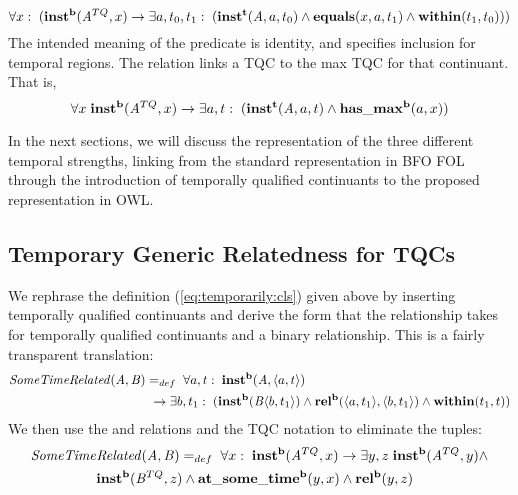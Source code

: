 \begin{equation}
\forall x:\; (\mathrm{\mathbf{inst^b}}(\mathit{A}^{TQ},x) \rightarrow \exists a,t_0,t_1:\;(
\mathrm{\mathbf{inst^t}}(\mathit{A},a,t_0) \wedge \mathrm{\mathbf{equals}}(x,a,t_1) \wedge
\mathrm{\mathbf{within}}(t_1,t_0)))
\end{equation}
The intended meaning of the predicate  is identity, and  specifies inclusion for temporal regions.  
The relation  links a TQC to the max TQC for that continuant. That is,
\begin{equation}
\forall x\; \mathrm{\mathbf{inst^b}}(\mathit{A}^{TQ},x) \rightarrow \exists a,t:\;(
\mathrm{\mathbf{inst^t}}(\mathit{A}, a,t) \wedge \mathrm{\mathbf{has\_max^b}}(a,x))
\end{equation}

In the next sections, we will discuss the representation of the three different
temporal strengths, linking from the standard representation in BFO FOL through
the introduction of temporally qualified continuants to the proposed
representation in OWL.

\subsection*{Temporary Generic Relatedness for TQCs}

We rephrase the definition (\ref{eq:temporarily:cls}) given above by inserting
temporally qualified continuants and derive the form that the relationship takes
for temporally qualified continuants and a binary relationship. This is a fairly
transparent translation:
%
\begin{equation}
\begin{split}
\mathit{SomeTimeRelated}(\mathit{A},\mathit{B})& =_{def}\;
\forall a, t:\; \mathrm{\mathbf{inst^b}}(\mathit{A}, \langle a,t\rangle) \\
&\ \rightarrow
\exists b, t_1:\;(\mathrm{\mathbf{inst^b}}(\mathit{B}\langle b,t_1\rangle) \wedge
\mathrm{\mathbf{rel^b}}(\langle a,t_1\rangle,\langle b,t_1\rangle) \wedge \mathrm{\mathbf{within}}(t_1,t))
\end{split}
\end{equation}
%
We then use the  and  relations and the TQC notation to eliminate
the tuples:
\begin{equation}
\begin{split}
\mathit{SomeTime}&\mathit{Related}(\mathit{A},\mathit{B}) =_{def}\;
\forall x:\; \mathrm{\mathbf{inst^b}}(\mathit{A}^{TQ}, x)
 \rightarrow
\exists y,z \; \mathrm{\mathbf{inst^b}}(\mathit{A}^{TQ},y) \wedge \\ & \mathrm{\mathbf{inst^b}}(\mathit{B}^{TQ},z)
 \wedge \mathrm{\mathbf{at\_some\_time^b}}(y,x) \wedge \mathrm{\mathbf{rel^b}}(y,z)
\end{split}
\label{eq:usesSame}
\end{equation}

